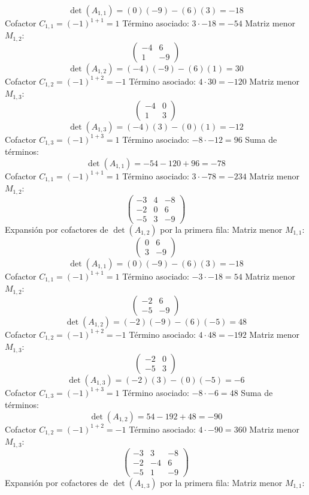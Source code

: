 \documentclass{article}
\begin{document}
\[\det(A_{1,1}) = (0)(-9) - (6)(3) = -18\]
Cofactor $C_{1,1} = (-1)^{1+1} = 1$
Término asociado: $ 3 \cdot -18 = -54 $
Matriz menor $M_{1,2}$:
\[\begin{pmatrix}-4 & 6 \\ 1 & -9\end{pmatrix}\]
\[\det(A_{1,2}) = (-4)(-9) - (6)(1) = 30\]
Cofactor $C_{1,2} = (-1)^{1+2} = -1$
Término asociado: $ 4 \cdot 30 = -120 $
Matriz menor $M_{1,3}$:
\[\begin{pmatrix}-4 & 0 \\ 1 & 3\end{pmatrix}\]
\[\det(A_{1,3}) = (-4)(3) - (0)(1) = -12\]
Cofactor $C_{1,3} = (-1)^{1+3} = 1$
Término asociado: $ -8 \cdot -12 = 96 $
Suma de términos:
\[\det(A_{1,1}) = -54 - 120 + 96 = -78\]
Cofactor $C_{1,1} = (-1)^{1+1} = 1$
Término asociado: $ 3 \cdot -78 = -234 $
Matriz menor $M_{1,2}$:
\[\begin{pmatrix}-3 & 4 & -8 \\ -2 & 0 & 6 \\ -5 & 3 & -9\end{pmatrix}\]
Expansión por cofactores de $\det(A_{1,2})$ por la primera fila:
Matriz menor $M_{1,1}$:
\[\begin{pmatrix}0 & 6 \\ 3 & -9\end{pmatrix}\]
\[\det(A_{1,1}) = (0)(-9) - (6)(3) = -18\]
Cofactor $C_{1,1} = (-1)^{1+1} = 1$
Término asociado: $ -3 \cdot -18 = 54 $
Matriz menor $M_{1,2}$:
\[\begin{pmatrix}-2 & 6 \\ -5 & -9\end{pmatrix}\]
\[\det(A_{1,2}) = (-2)(-9) - (6)(-5) = 48\]
Cofactor $C_{1,2} = (-1)^{1+2} = -1$
Término asociado: $ 4 \cdot 48 = -192 $
Matriz menor $M_{1,3}$:
\[\begin{pmatrix}-2 & 0 \\ -5 & 3\end{pmatrix}\]
\[\det(A_{1,3}) = (-2)(3) - (0)(-5) = -6\]
Cofactor $C_{1,3} = (-1)^{1+3} = 1$
Término asociado: $ -8 \cdot -6 = 48 $
Suma de términos:
\[\det(A_{1,2}) = 54 - 192 + 48 = -90\]
Cofactor $C_{1,2} = (-1)^{1+2} = -1$
Término asociado: $ 4 \cdot -90 = 360 $
Matriz menor $M_{1,3}$:
\[\begin{pmatrix}-3 & 3 & -8 \\ -2 & -4 & 6 \\ -5 & 1 & -9\end{pmatrix}\]
Expansión por cofactores de $\det(A_{1,3})$ por la primera fila:
Matriz menor $M_{1,1}$:
\end{document}
